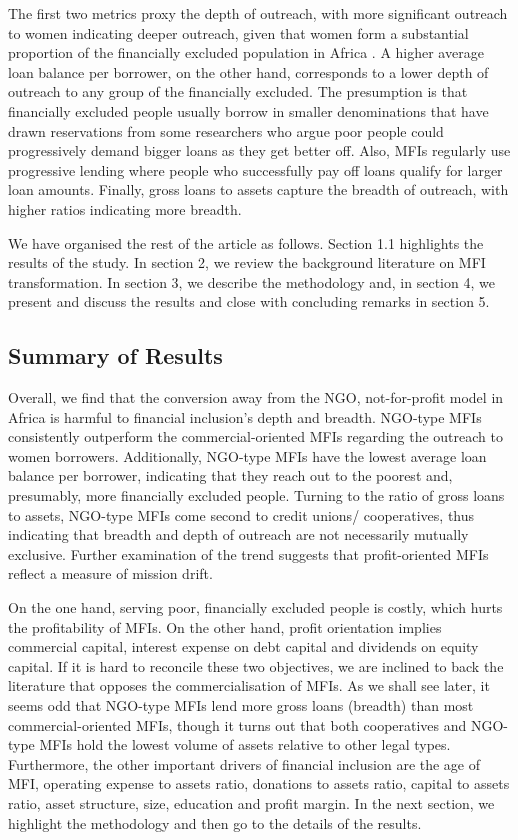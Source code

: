\documentclass[a4paper, nobind]{templates/ociamthesis}
\begin{document}
The first two metrics proxy the depth of outreach, with more significant outreach to women indicating deeper outreach, given that women form a substantial proportion of the financially excluded population in Africa \autocite{ayyagari2013financing}. A higher average loan balance per borrower, on the other hand, corresponds to a lower depth of outreach to any group of the financially excluded. The presumption is that financially excluded people usually borrow in smaller denominations that have drawn reservations from some researchers who argue poor people could progressively demand bigger loans as they get better off. Also, MFIs regularly use progressive lending where people who successfully pay off loans qualify for larger loan amounts. Finally, gross loans to assets capture the breadth of outreach, with higher ratios indicating more breadth.

We have organised the rest of the article as follows. Section 1.1 highlights the results of the study. In section 2, we review the background literature on MFI transformation. In section 3, we describe the methodology and, in section 4, we present and discuss the results and close with concluding remarks in section 5.

\hypertarget{summary-of-results-1}{%
\subsection{Summary of Results}\label{summary-of-results-1}}

Overall, we find that the conversion away from the NGO, not-for-profit model in Africa is harmful to financial inclusion's depth and breadth. NGO-type MFIs consistently outperform the commercial-oriented MFIs regarding the outreach to women borrowers. Additionally, NGO-type MFIs have the lowest average loan balance per borrower, indicating that they reach out to the poorest and, presumably, more financially excluded people. Turning to the ratio of gross loans to assets, NGO-type MFIs come second to credit unions/ cooperatives, thus indicating that breadth and depth of outreach are not necessarily mutually exclusive. Further examination of the trend suggests that profit-oriented MFIs reflect a measure of mission drift.

On the one hand, serving poor, financially excluded people is costly, which hurts the profitability of MFIs. On the other hand, profit orientation implies commercial capital, interest expense on debt capital and dividends on equity capital. If it is hard to reconcile these two objectives, we are inclined to back the literature that opposes the commercialisation of MFIs. As we shall see later, it seems odd that NGO-type MFIs lend more gross loans (breadth) than most commercial-oriented MFIs, though it turns out that both cooperatives and NGO-type MFIs hold the lowest volume of assets relative to other legal types. Furthermore, the other important drivers of financial inclusion are the age of MFI, operating expense to assets ratio, donations to assets ratio, capital to assets ratio, asset structure, size, education and profit margin. In the next section, we highlight the methodology and then go to the details of the results.
\end{document}
